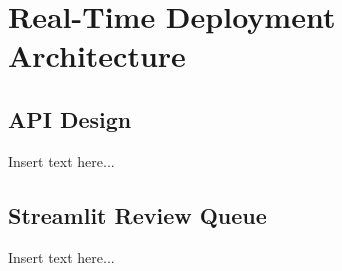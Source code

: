 \section{Real-Time Deployment Architecture}
\label{sec:deployment-architecture}

\subsection{API Design}
Insert text here...

\subsection{Streamlit Review Queue}
Insert text here...